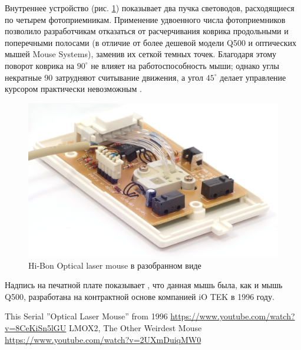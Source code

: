 \documentclass[11pt, a4paper]{article}
\begin{document}
Внутреннее устройство (рис. \ref{fig:OpticalLaserMouseInside}) показывает два пучка световодов, расходящиеся по четырем фотоприемникам. Применение удвоенного числа фотоприемников позволило разработчикам отказаться от расчерчивания коврика продольными и поперечными полосами (в отличие от более дешевой модели Q500 и оптических мышей Mouse Systems), заменив их сеткой темных точек. Благодаря этому поворот коврика на $90^\circ$ не влияет на работоспособность мыши; однако углы некратные 90 затрудняют считывание движения, а угол $45^\circ$ делает управление курсором практически невозможным \cite{comparison}.

\begin{figure}[h]
    \centering
    \includegraphics[scale=0.8]{1996_hi-bon_laser_mouse/inside_60.jpg}
    \caption{Hi-Bon Optical laser mouse в разобранном виде}
    \label{fig:OpticalLaserMouseInside}
\end{figure}

Надпись на печатной плате показывает , что данная мышь была, как и мышь Q500, разработана на контрактной основе компанией iO TEK в 1996 году.

\begin{thebibliography}{9}
 This Serial ''Optical Laser Mouse'' from 1996 \url{https://www.youtube.com/watch?v=8CeKiSn5lGU}
 LMOX2, The Other Weirdest Mouse \url{https://www.youtube.com/watch?v=2UXmDuiqMW0}

\end{thebibliography}
\end{document}
